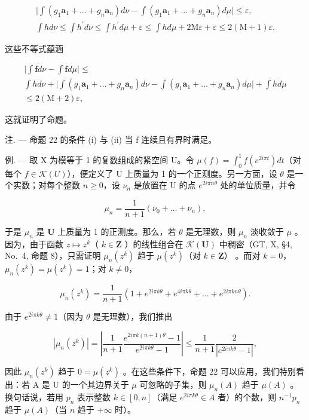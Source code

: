 \[
\begin{array}{c} \Big | \int (g _ {1} \mathbf {a} _ {1} + \dots + g _ {n} \mathbf {a} _ {n}) d \nu - \int (g _ {1} \mathbf {a} _ {1} + \dots + g _ {n} \mathbf {a} _ {n}) d \mu \Big | \leqslant \varepsilon , \\ \int h d \nu \leqslant \int h ^ {\prime} d \nu \leqslant \int h ^ {\prime} d \mu + \varepsilon \leqslant \int h d \mu + 2 \mathrm{M} \varepsilon + \varepsilon \leqslant 2 (\mathrm{M} + 1) \varepsilon . \end{array}
\]

这些不等式蕴涵

\[
\begin{array}{c} \Big | \int \mathbf {f}   d \nu - \int \mathbf {f}   d \mu \Big | \leqslant \\ \int h   d \nu + \Big | \int (g _ {1} \mathbf {a} _ {1} + \dots + g _ {n} \mathbf {a} _ {n})   d \nu - \int (g _ {1} \mathbf {a} _ {1} + \dots + g _ {n} \mathbf {a} _ {n})   d \mu \Big | + \int h   d \mu \\ \leqslant 2 (\mathrm{M} + 2) \varepsilon , \end{array}
\]

这就证明了命题。

注. --- 命题 22 的条件 (i) 与 (ii) 当 f 连续且有界时满足。

例. --- 取 X 为模等于 1 的复数组成的紧空间 U。令 \(\mu(f) = \int_{0}^{1} f(e^{2i\pi t}) dt\)（对每个 \(f \in \mathcal{K}(U)\)），便定义了 U 上质量为 1 的一个正测度。另一方面，设 \(\theta\) 是一个实数；对每个整数 \(n \geqslant 0\)，设 \(\nu_{n}\) 是放置在 U 的点 \(e^{2i\pi n\theta}\) 处的单位质量，并令

\[
\mu_ {n} = \frac {1}{n + 1} (\nu_ {0} + \dots + \nu_ {n}),
\]

于是 \(\mu_n\) 是 \(\mathbf{U}\) 上质量为 1 的正测度。那么，若 \(\theta\) 是无理数，则 \(\mu_n\) 淡收敛于 \(\mu\) 。因为，由于函数 \(z \mapsto z^k\)（ \(k \in \mathbf{Z}\) ）的线性组合在 \(\mathcal{K}(\mathbf{U})\) 中稠密（GT, X, §4, No.~4, 命题 8），只需证明 \(\mu_n(z^k)\) 趋于 \(\mu(z^k)\)（对 \(k \in \mathbf{Z}\)） 。而对 \(k = 0\)，\(\mu_n(z^k) = \mu(z^k) = 1\)；对 \(k \neq 0\)，

\[
\mu_ {n} (z ^ {k}) = \frac {1}{n + 1} (1 + e ^ {2 i \pi k \theta} + e ^ {4 i \pi k \theta} + \dots + e ^ {2 i \pi k n \theta}).
\]

由于 \(e^{2i\pi k\theta} \neq 1\)（因为 \(\theta\) 是无理数），我们推出

\[
\left| \mu_ {n} (z ^ {k}) \right| = \left| \frac {1}{n + 1} \frac {e ^ {2 i \pi k (n + 1) \theta} - 1}{e ^ {2 i \pi k \theta} - 1} \right| \leqslant \frac {1}{n + 1} \frac {2}{\left| e ^ {2 i \pi k \theta} - 1 \right|},
\]

因此 \(\mu_n(z^k)\) 趋于 \(0 = \mu (z^k)\) 。在这些条件下，命题 22 可以应用，我们特别看出：若 A 是 U 的一个其边界关于 \(\mu\) 可忽略的子集，则 \(\mu_n(A)\) 趋于 \(\mu(A)\) 。换句话说，若用 \(p_n\) 表示整数 \(k \in [0, n]\)（满足 \(e^{2i\pi k\theta} \in A\) 者）的个数，则 \(n^{-1}p_n\) 趋于 \(\mu(A)\)（当 \(n\) 趋于 \(+\infty\) 时）。

